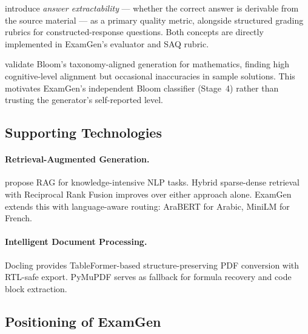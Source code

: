 \textbf{\citet{morris2024aqg}} introduce \textit{answer extractability} --- whether
the correct answer is derivable from the source material --- as a primary quality
metric, alongside structured grading rubrics for constructed-response questions.
Both concepts are directly implemented in ExamGen's evaluator and SAQ rubric.

\textbf{\citet{meissner2024itemforge}} validate Bloom's taxonomy-aligned generation
for mathematics, finding high cognitive-level alignment but occasional inaccuracies
in sample solutions. This motivates ExamGen's independent Bloom classifier (Stage~4)
rather than trusting the generator's self-reported level.

\subsection{Supporting Technologies}

\paragraph{Retrieval-Augmented Generation.}
\citet{lewis2020rag} propose RAG for knowledge-intensive NLP tasks. Hybrid
sparse-dense retrieval \cite{ma2021replication} with Reciprocal Rank Fusion
\cite{cormack2009rrf} improves over either approach alone. ExamGen extends this
with language-aware routing: AraBERT \cite{antoun2020arabert} for Arabic,
MiniLM \cite{reimers2019sentence} for French.

\paragraph{Intelligent Document Processing.}
Docling \cite{docling2024} provides TableFormer-based structure-preserving PDF
conversion with RTL-safe export. PyMuPDF \cite{pymupdf2023} serves as fallback
for formula recovery and code block extraction.

\subsection{Positioning of ExamGen}

